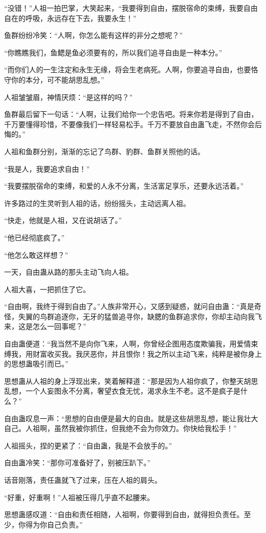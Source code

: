 \begin{this_body}
“没错！”人祖一拍巴掌，大笑起来，“我要得到自由，摆脱宿命的束缚，我要自由自在的呼吸，永远存在下去，我要永生！”

鱼群纷纷冷笑：“人啊，你怎么能有这样的非分之想呢？”

“你瞧瞧我们，鱼鳃是鱼必须要有的，所以我们追寻自由是一种本分。”

“而你们人的一生注定和永生无缘，将会生老病死。人啊，你要追寻自由，也要恪守你的本分，可不能胡思乱想。”

人祖皱皱眉，神情厌烦：“是这样的吗？”

鱼群最后留下一句话：“人啊，让我们给你一个忠告吧。将来你若是得到了自由，千万要懂得珍惜，不要像我们一样轻易松手。千万不要放自由蛊飞走，不然你会后悔的。”

人祖和鱼群分别，渐渐的忘记了鸟群、豹群、鱼群关照他的话。

“我是人，我要追求自由！”

“我要摆脱宿命的束缚，和爱的人永不分离，生活富足享乐，还要永远活着。”

许多路过的生灵听到人祖的话，纷纷摇头，主动远离人祖。

“快走，他就是人祖，又在说胡话了。”

“他已经彻底疯了。”

“他怎么敢这样想？”

一天，自由蛊从路的那头主动飞向人祖。

人祖大喜，一把抓住了它。

“自由啊，我终于得到自由了。”人族非常开心，又感到疑惑，就问自由蛊：“真是奇怪，失翼的鸟群追逐你，无牙的猛兽追寻你，缺腮的鱼群追求你，你却主动向我飞来，这是怎么一回事呢？”

自由蛊便道：“我当然不是向你飞来，人啊，你曾经企图用态度欺骗我，用爱情束缚我，用财富收买我。我厌恶你，并且恨你！我之所以主动飞来，纯粹是被你身上的思想蛊吸引而已。”

思想蛊从人祖的身上浮现出来，笑着解释道：“那是因为人祖你疯了，你整天胡思乱想，一个人妄图永不分离，奢望衣食无忧，渴求永生不老。这不是疯子是什么？”

自由蛊叹息一声：“思想的自由便是最大的自由。就是这些胡思乱想，能让我壮大自己。人祖啊，虽然我被你抓住，但我绝不会为你效力。你快给我松手！”

人祖摇头，捏的更紧了：“自由蛊，我是不会放手的。”

自由蛊冷笑：“那你可准备好了，别被压趴下。”

话音刚落，责任蛊就飞了过来，压在人祖的肩头。

“好重，好重啊！”人祖被压得几乎直不起腰来。

思想蛊感叹道：“自由和责任相随，人祖啊，你要得到自由，就得担负责任。至少，你得为你自己负责。”


\end{this_body}
